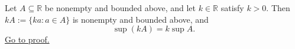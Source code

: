 \begin{theorem}
\label{thm:scalar-mult-positive}
Let $A\subseteq\mathbb{R}$ be nonempty and bounded above, and let
$k\in\mathbb{R}$ satisfy $k>0$.  Then $kA:=\{ka:a\in A\}$ is nonempty and
bounded above, and
\[
  \sup(kA)=k\sup A.
\]
\hyperref[prf:scalar-mult-positive]{Go to proof.}
\end{theorem}